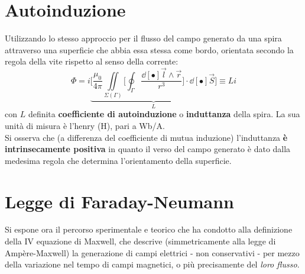 \section{Autoinduzione}
Utilizzando lo stesso approccio per il flusso del campo generato da una spira attraverso una superficie che abbia essa stessa come bordo, orientata secondo la regola della vite rispetto al senso della corrente:
\[\Phi = i \underbrace{\bigg[\frac{\mu_0}{4 \pi} \iint\limits_{\Sigma (\Gamma)} \bigg[\oint_{\Gamma} \frac{\dd[•]{\vec{l}} \wedge \vec{r}}{r^3}\bigg] \cdot \dd[•]{\vec{S}}\bigg]}_{L} \equiv L i\]
con $L$ definita \textbf{coefficiente di autoinduzione} o \textbf{induttanza} della spira. La sua unità di misura è l'henry (H), pari a Wb/A.
\\Si osserva che (a differenza del coefficiente di mutua induzione) l'induttanza \textbf{è intrinsecamente positiva} in quanto il verso del campo generato è dato dalla medesima regola che determina l'orientamento della superficie.

\section{Legge di Faraday-Neumann}
Si espone ora il percorso sperimentale e teorico che ha condotto alla definizione della IV equazione di Maxwell, che descrive (simmetricamente alla legge di Ampère-Maxwell) la generazione di campi elettrici - non conservativi - per mezzo della variazione nel tempo di campi magnetici, o più precisamente del \textit{loro flusso}. 


